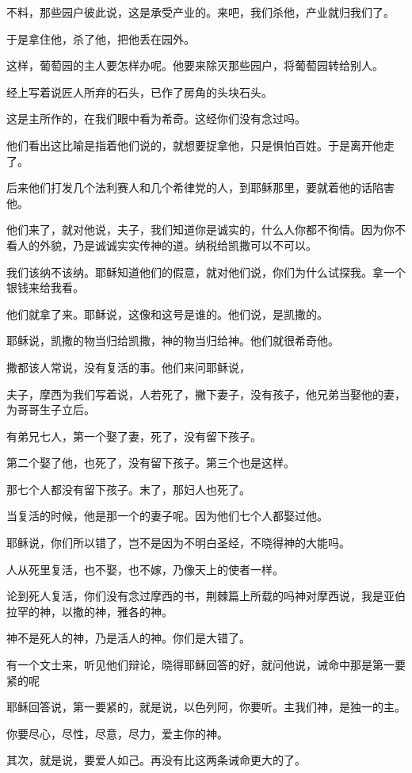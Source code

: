 \documentclass[12pt,oneside]{book}
\begin{document}
不料，那些园户彼此说，这是承受产业的。来吧，我们杀他，产业就归我们了。

于是拿住他，杀了他，把他丢在园外。

这样，葡萄园的主人要怎样办呢。他要来除灭那些园户，将葡萄园转给别人。

经上写着说匠人所弃的石头，已作了房角的头块石头。

这是主所作的，在我们眼中看为希奇。这经你们没有念过吗。

他们看出这比喻是指着他们说的，就想要捉拿他，只是惧怕百姓。于是离开他走了。

后来他们打发几个法利赛人和几个希律党的人，到耶稣那里，要就着他的话陷害他。

他们来了，就对他说，夫子，我们知道你是诚实的，什么人你都不徇情。因为你不看人的外貌，乃是诚诚实实传神的道。纳税给凯撒可以不可以。

我们该纳不该纳。耶稣知道他们的假意，就对他们说，你们为什么试探我。拿一个银钱来给我看。

他们就拿了来。耶稣说，这像和这号是谁的。他们说，是凯撒的。

耶稣说，凯撒的物当归给凯撒，神的物当归给神。他们就很希奇他。

撒都该人常说，没有复活的事。他们来问耶稣说，

夫子，摩西为我们写着说，人若死了，撇下妻子，没有孩子，他兄弟当娶他的妻，为哥哥生子立后。

有弟兄七人，第一个娶了妻，死了，没有留下孩子。

第二个娶了他，也死了，没有留下孩子。第三个也是这样。

那七个人都没有留下孩子。末了，那妇人也死了。

当复活的时候，他是那一个的妻子呢。因为他们七个人都娶过他。

耶稣说，你们所以错了，岂不是因为不明白圣经，不晓得神的大能吗。

人从死里复活，也不娶，也不嫁，乃像天上的使者一样。

论到死人复活，你们没有念过摩西的书，荆棘篇上所载的吗神对摩西说，我是亚伯拉罕的神，以撒的神，雅各的神。

神不是死人的神，乃是活人的神。你们是大错了。

有一个文士来，听见他们辩论，晓得耶稣回答的好，就问他说，诫命中那是第一要紧的呢

耶稣回答说，第一要紧的，就是说，以色列阿，你要听。主我们神，是独一的主。

你要尽心，尽性，尽意，尽力，爱主你的神。

其次，就是说，要爱人如己。再没有比这两条诫命更大的了。
\end{document}
